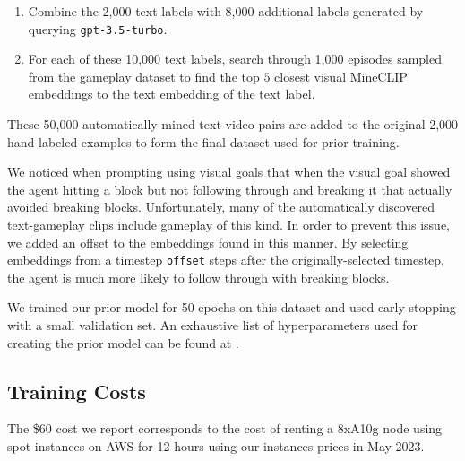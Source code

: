 \begin{enumerate}
    \item Combine the 2,000 text labels with 8,000 additional labels generated by querying \texttt{gpt-3.5-turbo}.
    \item For each of these 10,000 text labels, search through 1,000 episodes sampled from the gameplay dataset to find the top $5$ closest visual MineCLIP embeddings to the text embedding of the text label.
\end{enumerate}

These 50,000 automatically-mined text-video pairs are added to the original 2,000 hand-labeled examples to form the final dataset used for prior training.

We noticed when prompting \agentname{} using visual goals that when the visual goal showed the agent hitting a block but not following through and breaking it that \agentname{} actually avoided breaking blocks. Unfortunately, many of the automatically discovered text-gameplay clips include gameplay of this kind. In order to prevent this issue, we added an offset to the embeddings found in this manner. By selecting embeddings from a timestep \texttt{offset} steps after the originally-selected timestep, the agent is much more likely to follow through with breaking blocks.

We trained our prior model for 50 epochs on this dataset and used early-stopping with a small validation set. An exhaustive list of hyperparameters used for creating the prior model can be found at .

\subsection{Training Costs}

The \$60 cost we report corresponds to the cost of renting a 8xA10g node using spot instances on AWS for 12 hours using our instances prices in May 2023.